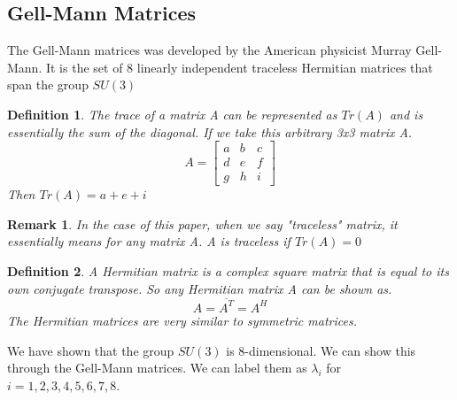 \documentclass[12pt,journal,compsoc]{IEEEtran}
\newtheorem{definition}{Definition}
\newtheorem*{rem}{Remark}
\begin{document}
\subsection{Gell-Mann Matrices}
The Gell-Mann matrices was developed by the American physicist Murray Gell-Mann. It is the set of 8 linearly independent traceless Hermitian matrices that span the group $SU(3)$\\
\begin{definition}
The trace of a matrix A can be represented as $Tr(A)$ and is essentially the sum of the diagonal. If we take this arbitrary 3x3 matrix A.
\[A = 
	\left[ \begin{matrix}
	a & b & c\\
	d & e & f\\
	g & h & i
	\end{matrix} \right]
\]
Then $Tr(A) = a + e + i$
\end{definition}
\begin{rem}
In the case of this paper, when we say "traceless" matrix, it essentially means for any matrix A. A is traceless if $Tr(A) = 0$
\end{rem}
\begin{definition}
A Hermitian matrix is a complex square matrix that is equal to its own conjugate transpose. So any Hermitian matrix A can be shown as.
\[ A = \overline{A^T} = A^H\]
The Hermitian matrices are very similar to symmetric matrices.
\end{definition}
We have shown that the group $SU(3)$ is 8-dimensional. We can show this through the Gell-Mann matrices. We can label them as $\lambda_i$ for $i = 1,2,3,4,5,6,7,8$.\\
\end{document}
